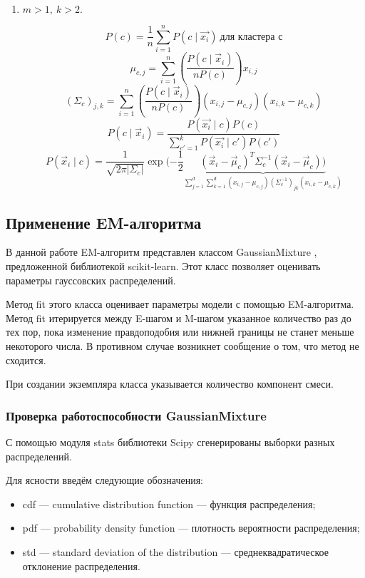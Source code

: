 \begin{enumerate}
    \item

    $m > 1, \ k > 2.$

    $$P(c) = \frac{1}{n} \sum_{i=1}^n P(c \mid  \vec{x_i}) \ \text{для кластера с}$$
    $$\mu_{c, j}=\sum_{i=1}^{n}\left(\frac{P\left(c \mid \vec{x}_{i}\right)}{n P(c)}\right) x_{i, j}$$
    $$\left(\Sigma_{c}\right)_{j, k}=\sum_{i=1}^{n}\left(\frac{P\left(c \mid \vec{x}_{i}\right)}{n P(c)}\right)\left(x_{i, j}-\mu_{c, j}\right)\left(x_{i, k}-\mu_{c, k}\right)$$
    $$P(c \mid \vec{x}_i) = \frac{P(\vec{x_i} \mid c)P(c)}{\sum_{c'=1}^k P(\vec{x_i} \mid c')P(c')}$$
    $$P\left(\vec{x}_{i} \mid c\right)=\frac{1}{\sqrt{2 \pi\left|\Sigma_{c}\right|}} \exp (-\frac{1}{2} \underbrace{\left(\vec{x}_{i}-\vec{\mu}_{c}\right)^{T}\Sigma_{c}^{-1}\left(\vec{x}_{i}-\vec{\mu}_{c}\right))}_{\sum_{j=1}^{d} \sum_{k=1}^{d}\left(x_{i, j}-\mu_{c, j}\right)\left(\Sigma_{c}^{-1}\right)_{j k}\left(x_{i, k}-\mu_{c, k}\right)}$$
    \end{enumerate}


\newpage
\subsection{Применение EM-алгоритма}

В данной работе EM-алгоритм представлен классом GaussianMixture \cite{sixth}, предложенной библиотекой scikit-learn. Этот класс позволяет оценивать параметры гауссовских распределений.

Метод fit этого класса оценивает параметры модели с помощью EM-алгоритма. Метод fit итерируется между E-шагом и M-шагом указанное количество раз до тех пор, пока изменение правдоподобия или нижней границы не станет меньше некоторого числа. В противном случае возникнет сообщение о том, что метод не сходится.

При создании экземпляра класса указывается количество компонент смеси.

\subsubsection{Проверка работоспособности GaussianMixture}

С помощью модуля stats \cite{seventh} библиотеки Scipy сгенерированы выборки разных распределений.

Для ясности введём следующие обозначения:
\begin{itemize}
    \item cdf --- cumulative distribution function --- функция распределения;
    \item pdf --- probability density function --- плотность вероятности распределения;
    \item std --- standard deviation of the distribution --- среднеквадратическое отклонение распределения.
\end{itemize}

